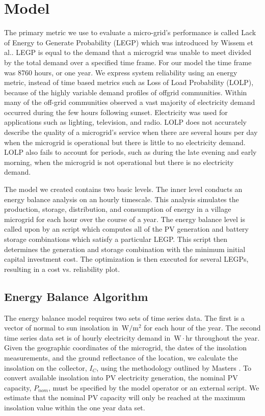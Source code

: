 \documentclass{article}
\newcommand{\unit}[1]{\ensuremath{\, \mathrm{#1}}}
\begin{document}
\section{Model}
The primary metric we use to evaluate a micro-grid's performance is called Lack of Energy to Generate Probability (LEGP) which was introduced by Wissem et al.\cite{}.
LEGP is equal to the demand that a microgrid was unable to meet divided by the total demand over a specified time frame. 
For our model the time frame was 8760 hours, or one year. 
We express system reliability using an energy metric, instead of time based metrics such as Loss of Load Probability (LOLP), because of the highly variable demand profiles of offgrid communities. 
Within many of the off-grid communities observed a vast majority of electricity demand occurred during the few hours following sunset.
Electricity was used for applications such as lighting, television, and radio. 
LOLP does not accurately describe the quality of a microgrid's service when there are several hours per day when the microgrid is operational but there is little to no electricity demand. 
LOLP also fails to account for periods, such as during the late evening and early morning, when the microgrid is not operational but there is no electricity demand.

The model we created contains two basic levels.
The inner level conducts an energy balance analysis on an hourly timescale.
This analysis simulates the production, storage, distribution, and consumption of energy in a village microgrid for each hour over the course of a year. 
The energy balance level is called upon by an script which computes all of the PV generation and battery storage combinations which satisfy a particular LEGP. 
This script then determines the generation and storage combination with the minimum initial capital investment cost. 
The optimization is then executed for several LEGPs, resulting in a cost vs. reliability plot.

\subsection{Energy Balance Algorithm}

The energy balance model requires two sets of time series data. 
The first is a vector of normal to sun insolation in \unit{W/m^2} for each hour of the year.
The second time series data set is of hourly electricity demand in \unit{W\cdot hr} throughout the year. 
Given the geographic coordinates of the microgrid, the dates of the insolation measurements, and the ground reflectance of the location, we calculate the insolation on the collector, $I_C$, using the methodology outlined by Masters \cite{}. 
To convert available insolation into PV electricity generation, the nominal PV capacity, $P_{nom}$, must be specified by the model operator or an external script.
We estimate that the nominal PV capacity will only be reached at the maximum insolation value within the one year data set.
\end{document}
